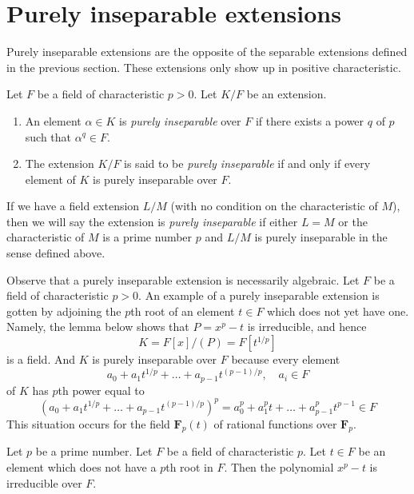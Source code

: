 \section{Purely inseparable extensions}
\label{section-purely-inseparable}

\noindent
Purely inseparable extensions are the opposite of the separable
extensions defined in the previous section. These extensions only
show up in positive characteristic.

\begin{definition}
\label{definition-purely-inseparable}
Let $F$ be a field of characteristic $p > 0$. Let $K/F$ be an extension.
\begin{enumerate}
\item An element $\alpha \in K$ is {\it purely inseparable} over $F$
if there exists a power $q$ of $p$ such that $\alpha^q \in F$.
\item The extension $K/F$ is said to be {\it purely inseparable}
if and only if every element of $K$ is purely inseparable over $F$.
\end{enumerate}
If we have a field extension $L/M$ (with no condition on the characteristic
of $M$), then we will say the extension is {\it purely inseparable}
if either $L = M$ or the characteristic of $M$ is a prime number $p$
and $L/M$ is purely inseparable in the sense defined above.
\end{definition}

\noindent
Observe that a purely inseparable extension is necessarily algebraic.
Let $F$ be a field of characteristic $p > 0$.
An example of a purely inseparable extension is gotten by adjoining
the $p$th root of an element $t \in F$ which does not yet have one. Namely,
the lemma below shows that $P = x^p - t$ is irreducible, and hence
$$
K = F[x]/(P) = F[t^{1/p}]
$$
is a field. And $K$ is purely inseparable over $F$ because every element
$$
a_0 + a_1t^{1/p} + \ldots + a_{p - 1}t^{(p - 1)/p},\quad a_i \in F
$$
of $K$ has $p$th power equal to
$$
(a_0 + a_1t^{1/p} + \ldots + a_{p - 1}t^{(p - 1)/p})^p =
a_0^p + a_1^p t + \ldots + a_{p - 1}^pt^{p - 1} \in F
$$
This situation occurs for the field
$\mathbf{F}_p(t)$ of rational functions over $\mathbf{F}_p$.

\begin{lemma}
\label{lemma-take-pth-root}
Let $p$ be a prime number. Let $F$ be a field of characteristic $p$.
Let $t \in F$ be an element which does not have a $p$th root in $F$.
Then the polynomial $x^p - t$ is irreducible over $F$.
\end{lemma}

